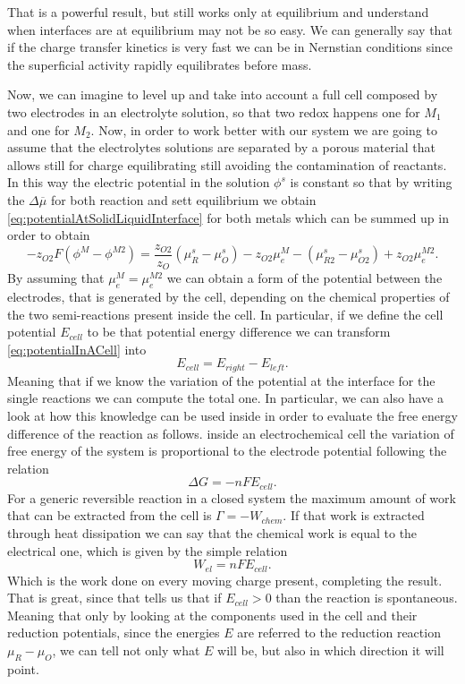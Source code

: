 \noindent
That is a powerful result, but still works only at equilibrium and understand when interfaces are at equilibrium may not be so easy. We can generally say that if the charge transfer kinetics is very fast we can be in Nernstian conditions since the superficial activity rapidly equilibrates before mass.

Now, we can imagine to level up and take into account a full cell composed by two electrodes in an electrolyte solution, so that two redox happens one for $M_1$ and one for $M_2$. Now, in order to work better with our system we are going to assume that the electrolytes solutions are separated by a porous material that allows still for charge equilibrating still avoiding the contamination of reactants.  In this way the electric potential in the solution $\phi^s$ is constant so that by writing the $\Delta \overline{\mu}$ for both reaction and sett equilibrium we obtain \eqref{eq:potentialAtSolidLiquidInterface} for both metals which can be summed up in order to obtain
\begin{equation}
    \label{eq:potentialInACell}
    -z_{O2}F(\phi^M - \phi^{M2}) = \frac{z_{O2}}{z_O}(\mu_R^s - \mu_O^s) - z_{O2}\mu_e^M - (\mu_{R2}^s - \mu_{O2}^s) + z_{O2}\mu_e^{M2}.
\end{equation}
By assuming that $\mu_e^M = \mu_e^{M2}$ we can obtain a form of the potential between the electrodes, that is generated by the cell, depending on the chemical properties of the two semi-reactions present inside the cell. In particular, if we define the cell potential $E_{cell}$ to be that potential energy difference we can transform \eqref{eq:potentialInACell} into
\begin{equation}
    E_{cell} = E_{right} - E_{left}.
\end{equation}
Meaning that if we know the variation of the potential at the interface for the single reactions we can compute the total one. In particular, we can also have a look at how this knowledge can be used inside in order to evaluate the free energy difference of the reaction as follows.
{
    inside an electrochemical cell the variation of free energy of the system is proportional to the electrode potential following the relation
    \begin{equation}
        \Delta G = -nF E_{cell}.
    \end{equation}
}
{
    For a generic reversible reaction in a closed system the maximum amount of work that can be extracted from the cell is $\Gamma = -W_{chem}$. If that work is extracted through heat dissipation we can say that the chemical work is equal to the electrical one, which is given by the simple relation
    \begin{equation}
        W_{el} = nFE_{cell}.
    \end{equation}
    Which is the work done on every moving charge present, completing the result.
}
\noindent
That is great, since that tells us that if $E_{cell}>0$ than the reaction is spontaneous. Meaning that only by looking at the components used in the cell and their reduction potentials, since the energies $E$ are referred to the reduction reaction $\mu_R - \mu_O$, we can tell not only what $E$ will be, but also in which direction it will point.

